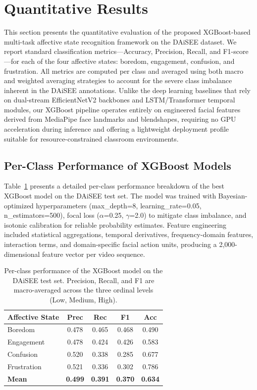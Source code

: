 \section{Quantitative Results}
\label{sec:quantitative-results}

This section presents the quantitative evaluation of the proposed XGBoost-based multi-task affective state recognition framework on the DAiSEE dataset. We report standard classification metrics---Accuracy, Precision, Recall, and F1-score---for each of the four affective states: boredom, engagement, confusion, and frustration. All metrics are computed per class and averaged using both macro and weighted averaging strategies to account for the severe class imbalance inherent in the DAiSEE annotations. Unlike the deep learning baselines that rely on dual-stream EfficientNetV2 backbones and LSTM/Transformer temporal modules, our XGBoost pipeline operates entirely on engineered facial features derived from MediaPipe face landmarks and blendshapes, requiring no GPU acceleration during inference and offering a lightweight deployment profile suitable for resource-constrained classroom environments.

\subsection{Per-Class Performance of XGBoost Models}
\label{sec:xgboost-per-class}

Table~\ref{tab:xgboost-per-class} presents a detailed per-class performance breakdown of the best XGBoost model on the DAiSEE test set. The model was trained with Bayesian-optimized hyperparameters (max\_depth=8, learning\_rate=0.05, n\_estimators=500), focal loss ($\alpha$=0.25, $\gamma$=2.0) to mitigate class imbalance, and isotonic calibration for reliable probability estimates. Feature engineering included statistical aggregations, temporal derivatives, frequency-domain features, interaction terms, and domain-specific facial action units, producing a 2,000-dimensional feature vector per video sequence.

\begin{table}[t]
\centering
\caption{Per-class performance of the XGBoost model on the DAiSEE test set. Precision, Recall, and F1 are macro-averaged across the three ordinal levels (Low, Medium, High).}
\label{tab:xgboost-per-class}
\begin{tabular}{lcccc}
\toprule
\textbf{Affective State} & \textbf{Prec} & \textbf{Rec} & \textbf{F1} & \textbf{Acc} \\
\midrule
Boredom     & 0.478 & 0.465 & 0.468 & 0.490 \\
Engagement  & 0.478 & 0.424 & 0.426 & 0.583 \\
Confusion   & 0.520 & 0.338 & 0.285 & 0.677 \\
Frustration & 0.521 & 0.336 & 0.302 & 0.786 \\
\midrule
\textbf{Mean} & \textbf{0.499} & \textbf{0.391} & \textbf{0.370} & \textbf{0.634} \\
\bottomrule
\end{tabular}
\end{table}


